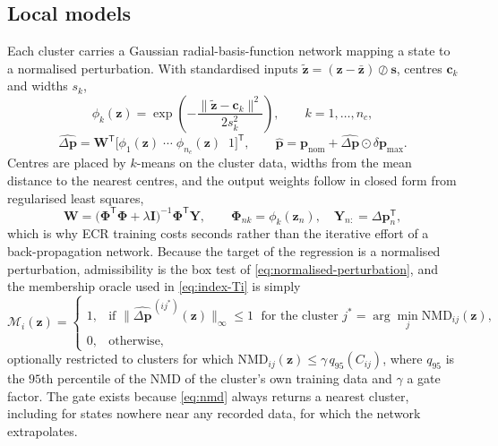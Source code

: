 \subsection{Local models}
\label{subsec:ecr-networks}

Each cluster carries a Gaussian radial-basis-function network mapping a state
to a normalised perturbation. With standardised inputs
$\tilde{\mathbf{z}}=(\mathbf{z}-\bar{\mathbf{z}})\oslash\mathbf{s}$, centres
$\mathbf{c}_k$ and widths $s_k$,
%
\begin{equation}
\phi_k(\mathbf{z})=\exp\!\left(-\frac{\|\tilde{\mathbf{z}}-\mathbf{c}_k\|^{2}}{2 s_k^{2}}\right),
\qquad k=1,\dots,n_c,
\label{eq:rbf-basis}
\end{equation}
%
\begin{equation}
\widehat{\Delta\mathbf{p}}=\mathbf{W}^{\mathsf T}\bigl[\phi_1(\mathbf{z})\;\cdots\;\phi_{n_c}(\mathbf{z})\;\;1\bigr]^{\mathsf T},
\qquad
\widehat{\mathbf{p}}=\mathbf{p}_{\mathrm{nom}}+\widehat{\Delta\mathbf{p}}\odot\delta\mathbf{p}_{\max}.
\label{eq:rbf-output}
\end{equation}
%
Centres are placed by $k$-means on the cluster data, widths from the mean
distance to the nearest centres, and the output weights follow in closed form
from regularised least squares,
%
\begin{equation}
\mathbf{W}=\bigl(\bm{\Phi}^{\mathsf T}\bm{\Phi}+\lambda\mathbf{I}\bigr)^{-1}\bm{\Phi}^{\mathsf T}\mathbf{Y},
\qquad
\bm{\Phi}_{nk}=\phi_k(\mathbf{z}_n),\quad
\mathbf{Y}_{n:}=\Delta\mathbf{p}_n^{\mathsf T},
\label{eq:rbf-weights}
\end{equation}
%
which is why ECR training costs seconds rather than the iterative effort of a
back-propagation network. Because the target of the regression is a normalised
perturbation, admissibility is the box test of
\eqref{eq:normalised-perturbation}, and the membership oracle used in
\eqref{eq:index-Ti} is simply
%
\begin{equation}
\mathcal{M}_i(\mathbf{z})=
\begin{cases}
1, & \text{if } \bigl\|\widehat{\Delta\mathbf{p}}^{\,(i j^{*})}(\mathbf{z})\bigr\|_{\infty}\le 1
\;\text{ for the cluster } j^{*}=\arg\min_j \mathrm{NMD}_{ij}(\mathbf{z}),\\
0, & \text{otherwise,}
\end{cases}
\label{eq:membership-oracle}
\end{equation}
%
optionally restricted to clusters for which
$\mathrm{NMD}_{ij}(\mathbf{z})\le\gamma\,q_{95}(C_{ij})$, where $q_{95}$ is the
$95$th percentile of the NMD of the cluster's own training data and $\gamma$ a
gate factor. The gate exists because \eqref{eq:nmd} always returns a nearest
cluster, including for states nowhere near any recorded data, for which the
network extrapolates.

